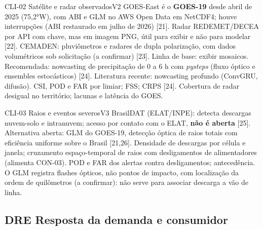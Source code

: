\begin{ficha}{CLI-02 \textperiodcentered{} Satélite e radar observados}{V2}
 GOES-East é o \textbf{GOES-19} desde abril de 2025 (75,2°W),
com ABI e GLM no AWS Open Data em NetCDF4; houve interrupções (ABI restaurado
em julho de 2026) [21]. Radar REDEMET/DECEA por API com chave, mas em imagem
PNG, útil para exibir e não para modelar [22]. CEMADEN: pluviômetros e radares
de dupla polarização, com dados volumétricos sob solicitação (a confirmar)
[23].
 Linha de base: exibir mosaicos. Recomendada: nowcasting de
precipitação de 0 a 6 h com \emph{pysteps} (fluxo óptico e ensembles
estocásticos) [24]. Literatura recente: nowcasting profundo (ConvGRU, difusão).
 CSI, POD e FAR por limiar; FSS; CRPS [24].
 Cobertura de radar desigual no território; lacunas e
latência do GOES.
\end{ficha}

\begin{ficha}{CLI-03 \textperiodcentered{} Raios e eventos severos}{V3}
 BrasilDAT (ELAT/INPE): detecta descargas nuvem-solo e
intranuvem; acesso por contato com o ELAT, \textbf{não é aberta} [25].
Alternativa aberta: GLM do GOES-19, detecção óptica de raios totais com
eficiência uniforme sobre o Brasil [21,26].
 Densidade de descargas por célula e janela; cruzamento
espaço-temporal de raios com desligamentos de alimentadores (alimenta
CON-03).
 POD e FAR dos alertas contra desligamentos; antecedência.
 O GLM registra flashes ópticos, não pontos de impacto, com
localização da ordem de quilômetros (a confirmar): não serve para associar
descarga a vão de linha.
\end{ficha}

\subsection{DRE \textperiodcentered{} Resposta da demanda e consumidor}

